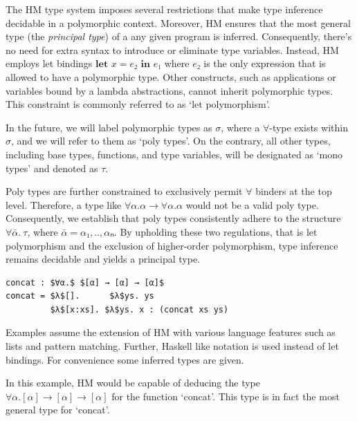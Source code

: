 \documentclass[runningheads]{llncs}
\newcommand{\kwlet}{\textbf{let }}
\newcommand{\kwin}{\textbf{ in }}
\begin{document}
The HM type system imposes several restrictions that make type
inference decidable in a polymorphic context. Moreover, HM ensures that the
most general type (the \emph{principal type}) of a any given program is
inferred.
Consequently, there's no need for extra syntax to introduce or eliminate type
variables.
Instead, HM employs let bindings $\kwlet x = e₂ \kwin e₁$ where $e₂$ is the
only expression that is allowed to have a polymorphic type.
Other constructs, such as applications or variables bound by a lambda
abstractions, cannot inherit polymorphic types.
This constraint is commonly referred to as `let polymorphism'.

In the future, we will label polymorphic types as $σ$, where a $∀$-type exists
within $σ$, and we will refer to them as `poly types'.
On the contrary, all other types, including base
types, functions, and type variables, will be designated as `mono types' and
denoted as $τ$.

Poly types are further constrained to exclusively permit $∀$ binders at the top
level.
Therefore, a type like $∀α. α → ∀α. α$ would not be a valid poly type.
Consequently, we establish that poly types consistently adhere to the structure
$∀\bar{α}. \ τ$, where $\bar{α} = α₁,..,αₙ$.
By upholding these two regulations, that is let polymorphism and the exclusion
of
higher-order polymorphism, type inference remains decidable and
yields a principal type.
\begin{example}
  \begin{lstlisting}
concat : $∀α.$ $[α] → [α] → [α]$
concat = $λ$[].      $λ$ys. ys           
         $λ$[x:xs]. $λ$ys. x : (concat xs ys)   
  \end{lstlisting}
\end{example}
Examples assume the extension of HM with various language features such as
lists and pattern matching.
Further, Haskell like notation is used instead of let bindings.
For convenience some inferred types are given.

In this example, HM would be capable of deducing the type $∀α.[α] → [α] → [α]$
for the function `concat'.
This type is in fact the most general type for `concat'.
\end{document}
